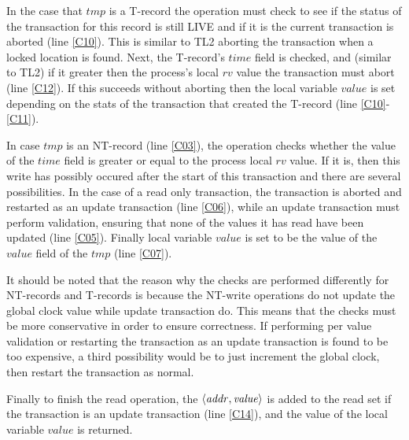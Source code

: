 \documentclass[11pt,letterpaper]{article}
\begin{document}
In the case that $\mathit{tmp}$ is a T-record the operation must check to see
if the status of the transaction for this record is still LIVE and if it is
the current transaction is aborted (line \ref{C10}).
This is similar to TL2 aborting the transaction when a locked location is found.
Next, the T-record's $\mathit{time}$ field is checked, and (similar to TL2) if it 
greater then the process's local $\mathit{rv}$ value the transaction must abort 
(line \ref{C12}).
If this succeeds without aborting then the local variable $\mathit{value}$
is set depending on the stats of the transaction that created the T-record (line \ref{C10}-\ref{C11}).


In case $\mathit{tmp}$ is an 
NT-record (line \ref{C03}), the operation
checks whether the value of the $\mathit{time}$ field is
greater or equal to the process local $\mathit{rv}$ value.
If it is, then this write has possibly occured after the start of this
transaction and there are several possibilities.
In the case of a read only transaction, the transaction
is aborted and restarted as an update transaction (line \ref{C06}),
while an update transaction must perform validation, ensuring
that none of the values it has read have been updated (line \ref{C05}).
Finally local variable $\mathit{value}$ is set to be the value
of the $\mathit{value}$ field of the $\mathit{tmp}$ (line \ref{C07}).

It should be noted that the reason why the checks are performed differently
for NT-records and T-records is because the NT-write operations do not
update the global clock value while update transaction do.
This means that the checks must be more conservative in order to ensure correctness.
If performing per value validation or restarting the transaction as an update transaction
is found to be too expensive, a third possibility would be to just increment the global
clock, then restart the transaction as normal.


Finally to finish the read operation, the $\left \langle \mathit{addr, value} \right \rangle $
is added to the read set if the transaction is an update transaction (line \ref{C14}),
and the value of the local variable $\mathit{value}$  is returned.
\end{document}
